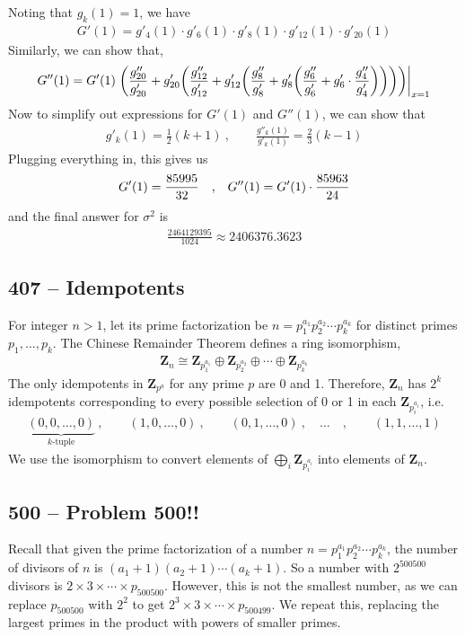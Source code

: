 \documentclass{article}
\begin{document}
Noting that $g_k(1) = 1$, we have
\begin{align*} 
	G'(1) = g'_4(1) \cdot g'_6(1) \cdot g'_8(1) \cdot g'_{12}(1) \cdot g'_{20}(1)
\end{align*}
Similarly, we can show that,
\begin{align*}
	G''(1) = G'(1) \eval{\qty( \frac{g''_{20}}{g'_{20}} + g'_{20} \qty(\frac{g''_{12}}{g'_{12}} + g'_{12} \qty(\frac{g''_8}{g'_8} + g'_8 \qty(\frac{g''_6}{g'_6} + g'_6 \cdot \frac{g''_4}{g'_4}))))}_{x=1} 
\end{align*}
Now to simplify out expressions for $G'(1)$ and $G''(1)$, we can show that
\begin{align*}
	g'_k(1) = \frac{1}{2}(k+1) ~, \qquad \frac{g''_k(1)}{g'_k(1)} = \frac{2}{3}(k-1)
\end{align*}
Plugging everything in, this gives us
\begin{align*}
	G'(1) = \frac{85995}{32} \qq{,} G''(1) = G'(1) \cdot \frac{85963}{24}
\end{align*}
and the final answer for $\sigma^2$ is
\begin{align*}
	\frac{2464129395}{1024} \approx \boxed{ 2406376.3623}
\end{align*}

\subsection*{407 -- Idempotents} 
For integer $n > 1$, let its prime factorization be $n = p_1^{a_1} p_2^{a_2} \cdots p_k^{a_k}$ for distinct primes $p_1, \dotsc , p_k$.
The Chinese Remainder Theorem defines a ring isomorphism,
\begin{align*}
	\mathbf{Z}_n \cong \mathbf{Z}_{p_1^{a_1}} \oplus  \mathbf{Z}_{p_2^{a_2}} \oplus \cdots \oplus \mathbf{Z}_{p_k^{a_k}}
\end{align*}
The only idempotents in $\mathbf{Z}_{p^a}$ for any prime $p$ are 0 and 1.
Therefore, $\mathbf{Z}_n$ has $2^k$ idempotents corresponding to every possible selection of 0 or 1 in each $\mathbf{Z}_{p_i^{a_i}}$, i.e.
\begin{align*}
	\underbrace{(0, 0, \dotsc, 0)}_{k \text{-tuple}} ~, \qquad (1, 0, \dotsc, 0) ~, \qquad (0, 1, \dotsc, 0) ~, \quad \dotsc \quad , \qquad (1, 1, \dotsc, 1)
\end{align*}
We use the isomorphism to convert elements of $\bigoplus_i \mathbf{Z}_{p_i^{a_i}}$ into elements of $\mathbf{Z}_n $.


\subsection*{500 -- Problem 500!!} 
Recall that given the prime factorization of a number $n = p_1^{a_1} p_2^{a_2} \dotsb p_k^{a_k}$, the number of divisors of $n$ is $(a_1 + 1)(a_2 + 1)\cdots(a_k+1)$. 
So a number with $2^{500500}$ divisors is $2\times 3\times\cdots\times p_{500500}$. 
However, this is not the smallest number, as we can replace $p_{500500}$ with $2^2$ to get $2^3\times3\times\cdots\times p_{500499}$. 
We repeat this, replacing the largest primes in the product with powers of smaller primes.
\end{document}
